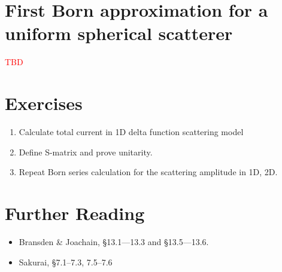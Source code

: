 \documentclass[pra,12pt]{revtex4}
\begin{document}
\section{First Born approximation for a uniform spherical scatterer}

\textcolor{red}{TBD}


\section*{Exercises}

\begin{enumerate}
\item Calculate total current in 1D delta function scattering model

\item Define S-matrix and prove unitarity.

\item Repeat Born series calculation for the scattering amplitude in 1D, 2D.
\end{enumerate}


\section*{Further Reading}

\begin{itemize}
\item Bransden \& Joachain, \S13.1---13.3 and \S13.5---13.6.
\item Sakurai, \S7.1--7.3, 7.5--7.6

\end{itemize}
\end{document}
